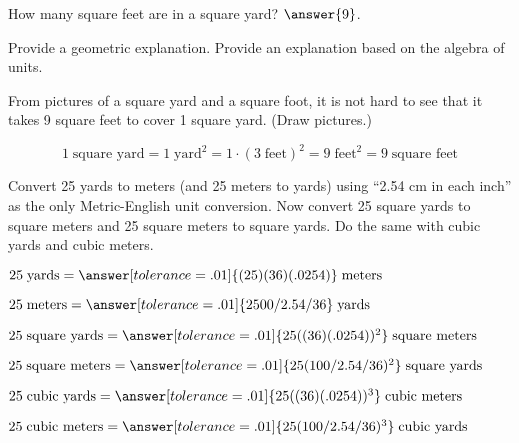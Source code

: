 \documentclass[nooutcomes]{ximera}
\begin{document}
\begin{question}
How many square feet are in a square yard?  $\answer{9}$.  

Provide a geometric explanation. Provide an explanation based on the algebra of units. 
\begin{freeResponse}
\begin{hint}
From pictures of a square yard and a square foot, it is not hard to see that it takes 9 square feet to cover 1 square yard.  (Draw pictures.)
\end{hint}
\begin{hint}
\[
1\;\textrm{square yard} = 1\;\textrm{yard}^2 = 1\cdot(3\;\textrm{feet})^2 = 9\;\textrm{feet}^2 = 9\;\textrm{square feet}
\]
\end{hint}
\end{freeResponse}
\end{question}

\begin{problem}
Convert 25 yards to meters (and 25 meters to yards) using ``2.54 cm in each inch'' as the only Metric-English unit conversion.  Now convert 25 square yards to square meters and 25 square meters to square yards.  Do the same with cubic yards and cubic meters.

$25\;\textrm{yards} = \answer[tolerance=.01]{(25)(36)(.0254)} \;\textrm{meters}$

$25\;\textrm{meters} = \answer[tolerance=.01]{2500/2.54/36} \;\textrm{yards}$

$25\;\textrm{square yards} = \answer[tolerance=.01]{25((36)(.0254))^2} \;\textrm{square meters}$

$25\;\textrm{square meters} = \answer[tolerance=.01]{25(100/2.54/36)^2} \;\textrm{square yards}$

$25\;\textrm{cubic yards} = \answer[tolerance=.01]{25((36)(.0254))^3} \;\textrm{cubic meters}$

$25\;\textrm{cubic meters} = \answer[tolerance=.01]{25(100/2.54/36)^3} \;\textrm{cubic yards}$

\end{problem}
\end{document}
